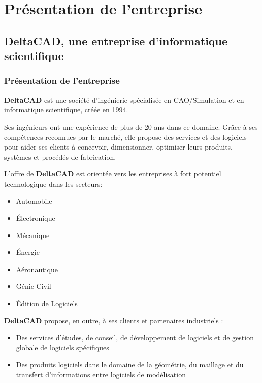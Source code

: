 \chapter{Présentation de l'entreprise}

\section{DeltaCAD, une entreprise d'informatique scientifique}

\subsection{Présentation de l'entreprise}

\textbf{DeltaCAD} est une société d'ingénierie spécialisée en CAO/Simulation et en informatique scientifique, créée en 1994.

Ses ingénieurs ont une expérience de plus de 20 ans dans ce domaine. Grâce à ses compétences reconnues par le marché, elle propose des services et des logiciels pour aider ses clients à concevoir, dimensionner, optimiser leurs produits, systèmes et procédés de fabrication.

L'offre de \textbf{DeltaCAD} est orientée vers les entreprises à fort potentiel technologique dans les secteurs:\\
\begin{itemize}
  \item Automobile
  \item Électronique
  \item Mécanique
  \item Énergie
  \item Aéronautique
  \item Génie Civil
  \item Édition de Logiciels
\end{itemize}
\vspace{5mm}

\textbf{DeltaCAD} propose, en outre, à ses clients et partenaires industriels :\\
\begin{itemize}
  \item Des services d'études, de conseil, de développement de logiciels et de gestion globale de logiciels spécifiques
  \item Des produits logiciels dans le domaine de la géométrie, du maillage et du transfert d'informations entre logiciels de modélisation
\end{itemize}
\vspace{5mm}


